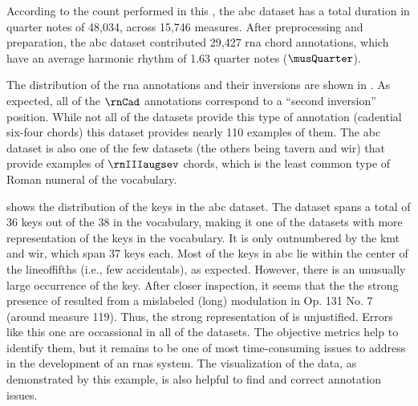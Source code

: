 
According to the count performed in this \thesisdiss{}, the
\gls{abc} dataset has a total duration in quarter notes of
48,034, across 15,746 measures. After preprocessing and
preparation, the \gls{abc} dataset contributed 29,427
\gls{rna} chord annotations, which have an average harmonic
rhythm of 1.63 quarter notes ($\musQuarter$).

The distribution of the \gls{rna} annotations and their
inversions are shown in . As
expected, all of the $\rnCad$ annotations correspond to a
``second inversion'' position. While not all of the datasets
provide this type of annotation (cadential six-four chords)
this dataset provides nearly 110 examples of them. The
\gls{abc} dataset is also one of the few datasets (the
others being \gls{tavern} and \gls{wir}) that provide
examples of $\rnIIIaugsev$ chords, which is the least common
type of Roman numeral of the vocabulary.



 shows the distribution of the keys
in the \gls{abc} dataset. The dataset spans a total of 36
keys out of the 38 in the vocabulary, making it one of the
datasets with more representation of the keys in the
vocabulary. It is only outnumbered by the \gls{kmt} and
\gls{wir}, which span 37 keys each. Most of the keys in
\gls{abc} lie within the center of the \gls{lineoffifths}
(i.e., few accidentals), as expected. However, there is an
unusually large occurrence of the \keyDs{} key. After closer
inspection, it seems that the the strong presence of
\keyDs{} resulted from a mislabeled (long) modulation in Op.
131 No. 7 (around measure 119). Thus, the strong
representation of \keyDs{} is unjustified. Errors like this
one are occassional in all of the datasets. The objective
metrics help to identify them, but it remains to be one of
most time-consuming issues to address in the development of
an \glspl{rna} system. The visualization of the data, as
demonstrated by this example, is also helpful to find and
correct annotation issues.


